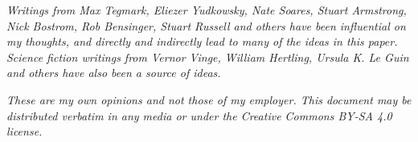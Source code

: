 \documentclass[letterpaper,twocolumn]{article}
\begin{document}
\emph{Writings from Max Tegmark, Eliezer Yudkowsky, Nate Soares,
Stuart Armstrong, Nick Bostrom, Rob Bensinger, Stuart Russell and
others have been influential on my thoughts, and directly and
indirectly lead to many of the ideas in this paper.  Science fiction
writings from Vernor Vinge, William Hertling, Ursula K. Le Guin and
others have also been a source of ideas.}

\emph{These are my own opinions and not those of my employer. This
document may be distributed verbatim in any media or under the
Creative Commons BY-SA 4.0 license.}

{}

\end{document}
